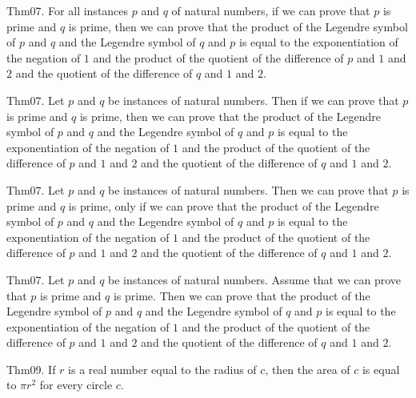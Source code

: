 \documentclass{article}
\begin{document}
Thm07. For all instances $p$ and $q$ of natural numbers, if we can prove that $p$ is prime and $q$ is prime, then we can prove that the product of the Legendre symbol of $p$ and $q$ and the Legendre symbol of $q$ and $p$ is equal to the exponentiation of the negation of $1$ and the product of the quotient of the difference of $p$ and $1$ and $2$ and the quotient of the difference of $q$ and $1$ and $2$.

Thm07. Let $p$ and $q$ be instances of natural numbers. Then if we can prove that $p$ is prime and $q$ is prime, then we can prove that the product of the Legendre symbol of $p$ and $q$ and the Legendre symbol of $q$ and $p$ is equal to the exponentiation of the negation of $1$ and the product of the quotient of the difference of $p$ and $1$ and $2$ and the quotient of the difference of $q$ and $1$ and $2$.

Thm07. Let $p$ and $q$ be instances of natural numbers. Then we can prove that $p$ is prime and $q$ is prime, only if we can prove that the product of the Legendre symbol of $p$ and $q$ and the Legendre symbol of $q$ and $p$ is equal to the exponentiation of the negation of $1$ and the product of the quotient of the difference of $p$ and $1$ and $2$ and the quotient of the difference of $q$ and $1$ and $2$.

Thm07. Let $p$ and $q$ be instances of natural numbers. Assume that we can prove that $p$ is prime and $q$ is prime. Then we can prove that the product of the Legendre symbol of $p$ and $q$ and the Legendre symbol of $q$ and $p$ is equal to the exponentiation of the negation of $1$ and the product of the quotient of the difference of $p$ and $1$ and $2$ and the quotient of the difference of $q$ and $1$ and $2$.

Thm09. If $r$ is a real number equal to the radius of $c$, then the area of $c$ is equal to $\pi r ^ {2}$ for every circle $c$.
\end{document}
